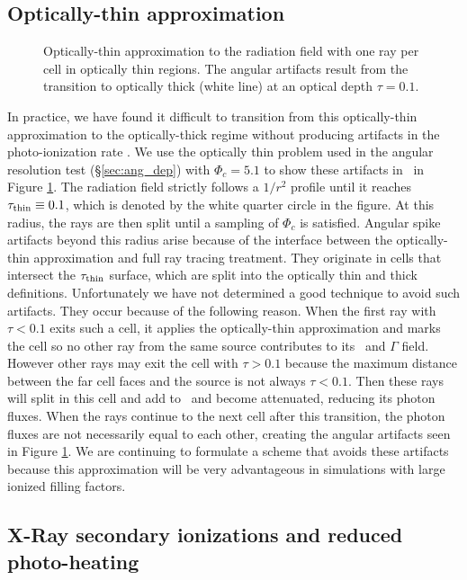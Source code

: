 \documentclass[apj,onecolumn]{emulateapj}
\begin{document}
\subsection{Optically-thin approximation}

\begin{figure}[t]
  \caption{\label{fig:rayopt} Optically-thin approximation to the
    radiation field with one ray per cell in optically thin regions.
    The angular artifacts result from the transition to optically
    thick (white line) at an optical depth $\tau = 0.1$.}
\end{figure}

In practice, we have found it difficult to transition from this
optically-thin approximation to the optically-thick regime without
producing artifacts in the photo-ionization rate \kph.  We use the
optically thin problem used in the angular resolution test
(\S\ref{sec:ang_dep}) with $\Phi_c = 5.1$ to show these artifacts in
\kph~in Figure \ref{fig:rayopt}.  The radiation field strictly follows
a $1/r^2$ profile until it reaches $\tau_{\rm thin} \equiv 0.1$, which
is denoted by the white quarter circle in the figure.  At this radius,
the rays are then split until a sampling of $\Phi_c$ is satisfied.
Angular spike artifacts beyond this radius arise because of the
interface between the optically-thin approximation and full ray
tracing treatment.  They originate in cells that intersect the
$\tau_{\rm thin}$ surface, which are split into the optically thin and
thick definitions.  Unfortunately we have not determined a good
technique to avoid such artifacts.  They occur because of the
following reason.  When the first ray with $\tau < 0.1$ exits such a
cell, it applies the optically-thin approximation and marks the cell
so no other ray from the same source contributes to its \kph~and
$\Gamma$ field.  However other rays may exit the cell with $\tau >
0.1$ because the maximum distance between the far cell faces and the
source is not always $\tau < 0.1$.  Then these rays will split in this
cell and add to \kph~and become attenuated, reducing its photon
fluxes.  When the rays continue to the next cell after this
transition, the photon fluxes are not necessarily equal to each other,
creating the angular artifacts seen in Figure \ref{fig:rayopt}.  We
are continuing to formulate a scheme that avoids these artifacts
because this approximation will be very advantageous in simulations
with large ionized filling factors.

\subsection{X-Ray secondary ionizations and reduced photo-heating}
\end{document}
